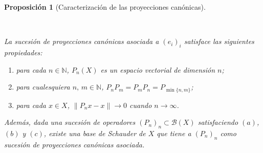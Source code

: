 \documentclass[
  spanish,
  letterpaper,
  DIV=11,
  numbers=noendperiod]{scrreprt}
\newtheorem{proposition}[theorem]{Proposición}
\theoremstyle{definition}
\theoremstyle{remark}
\theoremstyle{definition}
\theoremstyle{exampstyle}
\theoremstyle{plain}
\theoremstyle{plain}
\newtheorem{proposition}{Proposición}[chapter]
\theoremstyle{definition}
\theoremstyle{plain}
\theoremstyle{remark}
\begin{document}
\begin{proposition}[Caracterización de las proyecciones
canónicas]\protect\hypertarget{prp-proyeciones}{}\label{prp-proyeciones}

~

\hspace*{1mm}

La sucesión de proyecciones canónicas asociada a \((e_i)_i\) satisface
las siguientes propiedades:

\begin{enumerate}
\def\labelenumi{(\alph{enumi})}
\item
  para cada \(n\in\mathbb{N}\), \(P_n(X)\) es un espacio vectorial de
  dimensión \(n\);
\item
  para cualesquiera \(n,\,m\in\mathbb{N}\),
  \(P_nP_m=P_mP_n=P_{\min\{n,m\}}\);
\item
  para cada \(x\in X\), \(\|P_nx-x\|\to 0\) cuando \(n\to\infty\).
\end{enumerate}

Además, dada una sucesión de operadores \((P_n)_n\subset\mathcal{B}(X)\)
satisfaciendo \((a)\), \((b)\) y \((c)\), existe una base de Schauder de
\(X\) que tiene a \((P_n)_n\) como sucesión de proyecciones canónicas
asociada.

\end{proposition}
\end{document}
